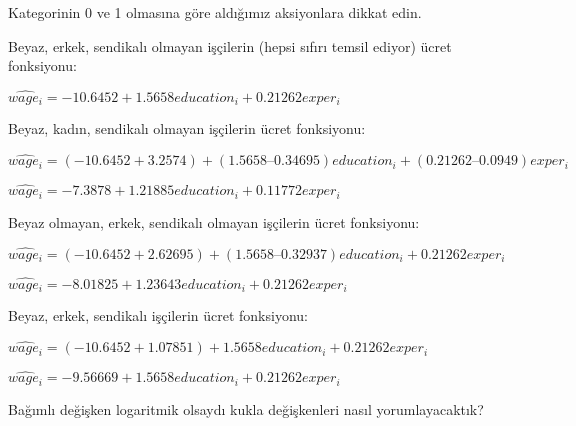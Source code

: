 \documentclass[
]{book}
\newenvironment{Shaded}{\begin{snugshade}}{\end{snugshade}}
\newcommand{\DataTypeTok}[1]{\textcolor[rgb]{0.13,0.29,0.53}{#1}}
\newcommand{\KeywordTok}[1]{\textcolor[rgb]{0.13,0.29,0.53}{\textbf{#1}}}
\newcommand{\NormalTok}[1]{#1}
\newcommand{\OperatorTok}[1]{\textcolor[rgb]{0.81,0.36,0.00}{\textbf{#1}}}
\newcommand{\StringTok}[1]{\textcolor[rgb]{0.31,0.60,0.02}{#1}}
\begin{document}
Kategorinin 0 ve 1 olmasına göre aldığımız aksiyonlara dikkat edin.

Beyaz, erkek, sendikalı olmayan işçilerin (hepsi sıfırı temsil ediyor) ücret fonksiyonu:

\(\hat{wage_i} = -10.6452 + 1.5658education_i + 0.21262exper_i\)

Beyaz, kadın, sendikalı olmayan işçilerin ücret fonksiyonu:

\(\hat{wage_i} = (-10.6452 + 3.2574) + (1.5658 – 0.34695)education_i + (0.21262 – 0.0949)exper_i\)

\(\hat{wage_i} = -7.3878 + 1.21885education_i + 0.11772exper_i\)

Beyaz olmayan, erkek, sendikalı olmayan işçilerin ücret fonksiyonu:

\(\hat{wage_i} = (-10.6452 + 2.62695) + (1.5658 – 0.32937)education_i + 0.21262exper_i\)

\(\hat{wage_i} = -8.01825 + 1.23643education_i + 0.21262exper_i\)

Beyaz, erkek, sendikalı işçilerin ücret fonksiyonu:

\(\hat{wage_i} = (-10.6452 + 1.07851) + 1.5658education_i + 0.21262exper_i\)

\(\hat{wage_i} = -9.56669 + 1.5658education_i + 0.21262exper_i\)

Bağımlı değişken logaritmik olsaydı kukla değişkenleri nasıl yorumlayacaktık?

\begin{Shaded}
\end{Shaded}
\end{document}
